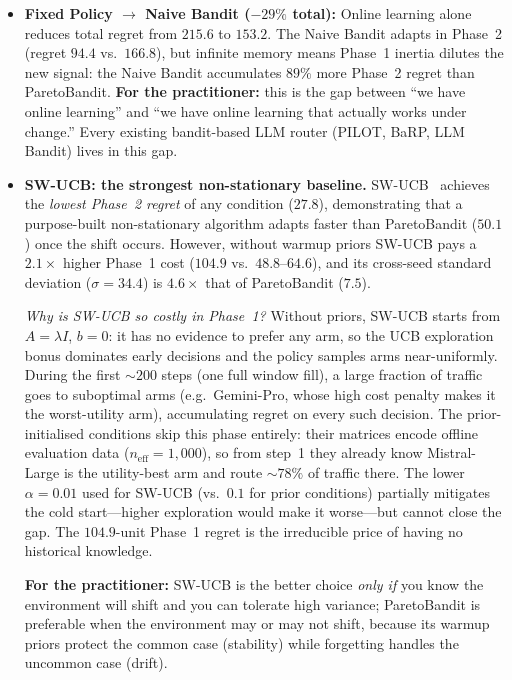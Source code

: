 \begin{itemize}[nosep,leftmargin=*]
  \item \textbf{Fixed Policy $\to$ Naive Bandit ($-29\%$ total):}
    Online learning alone reduces total regret from $215.6$ to
    $153.2$.  The Naive Bandit adapts in Phase~2 (regret
    $94.4$ vs.\ $166.8$), but infinite memory means Phase~1
    inertia dilutes the new signal: the Naive Bandit accumulates
    $89\%$ more Phase~2 regret than ParetoBandit.
    \textbf{For the practitioner:} this is the gap between
    ``we have online learning'' and ``we have online learning
    that actually works under change.''
    Every existing bandit-based LLM router
    (PILOT, BaRP, LLM Bandit) lives in this gap.

  \item \textbf{SW-UCB: the strongest non-stationary baseline.}
    SW-UCB~\cite{garivier2011switching} achieves the
    \emph{lowest Phase~2 regret} of any condition ($27.8$),
    demonstrating that a purpose-built non-stationary algorithm
    adapts faster than ParetoBandit ($50.1$) once the shift occurs.
    However, without warmup priors SW-UCB pays a $2.1\times$
    higher Phase~1 cost ($104.9$ vs.\ $48.8$--$64.6$), and its
    cross-seed standard deviation ($\sigma{=}34.4$) is
    $4.6\times$ that of ParetoBandit ($7.5$).

    \emph{Why is SW-UCB so costly in Phase~1?}
    Without priors, SW-UCB starts from $A{=}\lambda I$, $b{=}0$:
    it has no evidence to prefer any arm, so the UCB exploration
    bonus dominates early decisions and the policy samples arms
    near-uniformly.
    During the first ${\sim}200$ steps (one full window fill),
    a large fraction of traffic goes to suboptimal arms
    (e.g.\ Gemini-Pro, whose high cost penalty makes it the
    worst-utility arm), accumulating regret on every such
    decision.
    The prior-initialised conditions skip this phase entirely:
    their matrices encode offline evaluation data
    ($n_{\mathrm{eff}}{=}1{,}000$), so from step~1 they already
    know Mistral-Large is the utility-best arm and route
    ${\sim}78\%$ of traffic there.
    The lower $\alpha{=}0.01$ used for SW-UCB (vs.\ $0.1$ for
    prior conditions) partially mitigates the cold start---higher
    exploration would make it worse---but cannot close the gap.
    The $104.9$-unit Phase~1 regret is the irreducible price of
    having no historical knowledge.

    \textbf{For the practitioner:} SW-UCB is the better choice
    \emph{only if} you know the environment will shift and you
    can tolerate high variance; ParetoBandit is preferable when
    the environment may or may not shift, because its warmup
    priors protect the common case (stability) while forgetting
    handles the uncommon case (drift).


\end{itemize}
